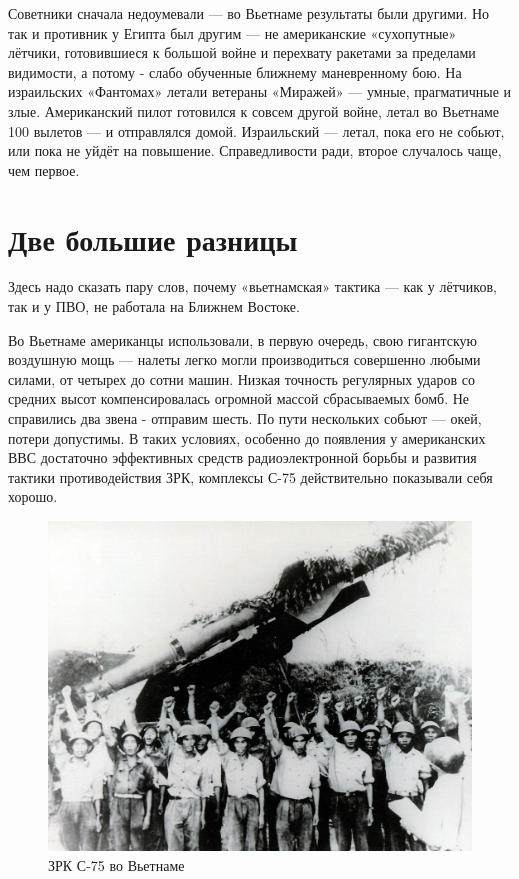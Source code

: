 Советники сначала недоумевали — во Вьетнаме результаты были другими. Но так и противник у Египта был другим — не американские «сухопутные» лётчики, готовившиеся к большой войне и перехвату ракетами за пределами видимости, а потому - слабо обученные ближнему маневренному бою. На израильских «Фантомах» летали ветераны «Миражей» — умные, прагматичные и злые. Американский пилот готовился к совсем другой войне, летал во Вьетнаме 100 вылетов — и отправлялся домой. Израильский — летал, пока его не собьют, или пока не уйдёт на повышение. Справедливости ради, второе случалось чаще, чем первое.

\section{Две большие разницы}

Здесь надо сказать пару слов, почему «вьетнамская» тактика — как у лётчиков, так и у ПВО, не работала на Ближнем Востоке.

Во Вьетнаме американцы использовали, в первую очередь, свою гигантскую воздушную мощь — налеты легко могли производиться совершенно любыми силами, от четырех до сотни машин. Низкая точность регулярных ударов со средних высот компенсировалась огромной массой сбрасываемых бомб. Не справились два звена - отправим шесть. По пути нескольких собьют — окей, потери допустимы. В таких условиях, особенно до появления у американских ВВС достаточно эффективных средств радиоэлектронной борьбы и развития тактики противодействия ЗРК, комплексы С-75 действительно показывали себя хорошо.

\begin{figure}[h!tb] 
	\centering\includegraphics[scale=0.4]{Dolina_2/5BWa6P70FCk.jpg}
	\caption{ЗРК С-75 во Вьетнаме}%
\end{figure}

